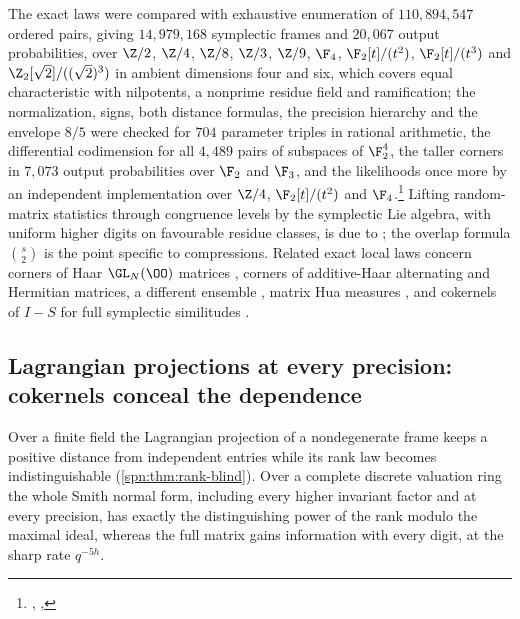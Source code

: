The exact laws were compared with exhaustive enumeration of $110{,}894{,}547$ ordered pairs, giving
$14{,}979{,}168$ symplectic frames and $20{,}067$ output probabilities, over $\Z/2$, $\Z/4$, $\Z/8$,
$\Z/3$, $\Z/9$, $\F_4$, $\F_2[t]/(t^2)$, $\F_2[t]/(t^3)$ and $\Z_2[\sqrt2]/((\sqrt2)^3)$ in
ambient dimensions four and six, which covers equal characteristic with nilpotents, a nonprime
residue field and ramification; the normalization, signs, both distance formulas, the precision
hierarchy and the envelope $8/5$ were checked for $704$ parameter triples in rational arithmetic,
the differential codimension for all $4{,}489$ pairs of subspaces of $\F_2^4$, the taller corners
in $7{,}073$ output probabilities over $\F_2$ and $\F_3$, and the likelihoods once more by an
independent implementation over $\Z/4$, $\F_2[t]/(t^2)$ and
$\F_4$.\footnote{\raggedright{},
,
}
Lifting random-matrix statistics through congruence levels by the symplectic Lie algebra, with
uniform higher digits on favourable residue classes, is due to
\cite[Sections~8.2.1--8.2.3]{Pirani2024Traces}; the overlap formula $\binom s2$ is the point
specific to compressions. Related exact local laws concern corners of Haar $\GL_N(\OO)$ matrices
\cite{VanPeski2021Limits}, corners of additive-Haar alternating and Hermitian matrices, a
different ensemble \cite{ShenVanPeski2025NonArchimedean}, matrix Hua measures
\cite{Neretin2013Hua}, and cokernels of $I-S$ for full symplectic similitudes
\cite{Garton2015Random}.

\subsection{Lagrangian projections at every precision: cokernels conceal the dependence}\label{spn:sec:local}

Over a finite field the Lagrangian projection of a nondegenerate frame keeps a positive distance from
independent entries while its rank law becomes indistinguishable (\cref{spn:thm:rank-blind}). Over a
complete discrete valuation ring the whole Smith normal form, including every higher invariant
factor and at every precision, has exactly the distinguishing power of the rank modulo the maximal
ideal, whereas the full matrix gains information with every digit, at the sharp rate $q^{-5h}$.

